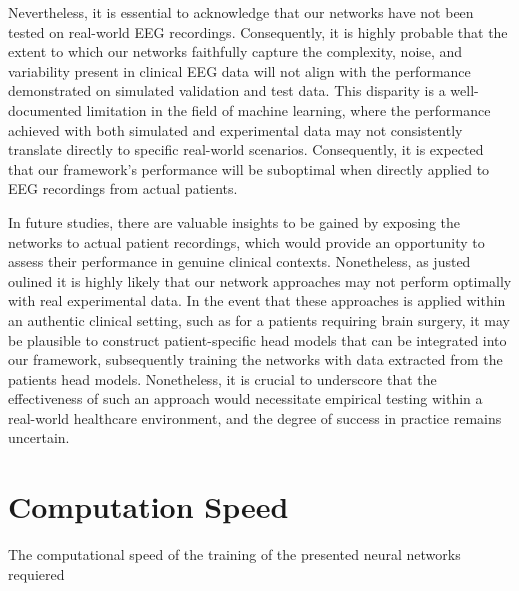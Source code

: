 \documentclass[a4paper, UKenglish, 11pt]{uiomaster}
\begin{document}
Nevertheless, it is essential to acknowledge that our networks have not been tested on real-world EEG recordings. Consequently, it is highly probable that the extent to which our networks faithfully capture the complexity, noise, and variability present in clinical EEG data will not align with the performance demonstrated on simulated validation and test data. This disparity is a well-documented limitation in the field of machine learning, where the performance achieved with both simulated and experimental data may not consistently translate directly to specific real-world scenarios. Consequently, it is expected that our framework's performance will be suboptimal when directly applied to EEG recordings from actual patients.

In future studies, there are valuable insights to be gained by exposing the networks to actual patient recordings, which would provide an opportunity to assess their performance in genuine clinical contexts. Nonetheless, as justed oulined it is highly likely that our network approaches may not perform optimally with real experimental data. In the event that these approaches is applied within an authentic clinical setting, such as for a patients requiring brain surgery, it may be plausible to construct patient-specific head models that can be integrated into our framework, subsequently training the networks with data extracted from the patients head models. Nonetheless, it is crucial to underscore that the effectiveness of such an approach would necessitate empirical testing within a real-world healthcare environment, and the degree of success in practice remains uncertain.

\section{Computation Speed} \label{sec:convdip}
The computational speed of the training of the presented neural networks requiered
\end{document}
